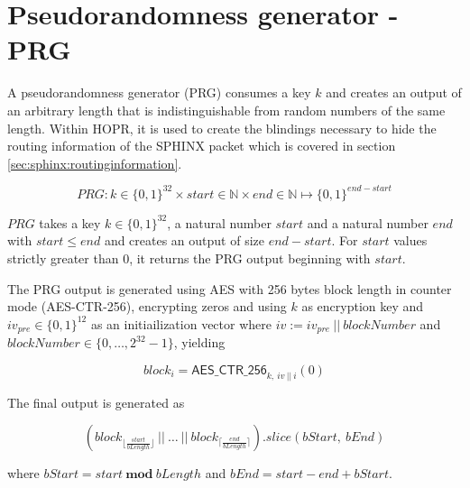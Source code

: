 \section{Pseudorandomness generator - PRG}
\label{appendix:prg}

A pseudorandomness generator (PRG) consumes a key $k$ and creates an output of an arbitrary length that is indistinguishable from random numbers of the same length. Within HOPR, it is used to create the blindings necessary to hide the routing information of the SPHINX packet which is covered in section \ref{sec:sphinx:routinginformation}.

$$ PRG : k \in \{ 0,1 \}^{32} \times start \in \mathbb{N} \times end \in \mathbb{N} \mapsto \{ 0,1 \}^{end - start} $$

$PRG$ takes a key $k \in \{ 0,1 \}^{32}$, a natural number $start$ and a natural number $end$ with $start \le end$ and creates an output of size $end - start$. For $start$ values strictly greater than $0$, it returns the PRG output beginning with $start$.

The PRG output is generated using AES with 256 bytes block length in counter mode (AES-CTR-256), encrypting zeros and using $k$ as encryption key and $iv_{pre} \in \{ 0, 1 \}^{12}$ as an initiailization vector where $iv := iv_{pre} \ || \ blockNumber$ and $blockNumber \in \{ 0, \dots, 2^{32} - 1 \}$, yielding

$$ block_i = \mathsf{AES\_CTR\_256}_{k, \ iv \ || \ i}(0) $$

The final output is generated as

$$ ( block_{\lfloor \frac{start}{bLength}\rfloor} \ || \ \dots \ || \ block_{\lceil \frac{end}{bLength}\rceil} ).slice(bStart, \ bEnd)$$

where $bStart=start \ \textbf{mod} \ bLength$ and $bEnd = start - end + bStart$.

